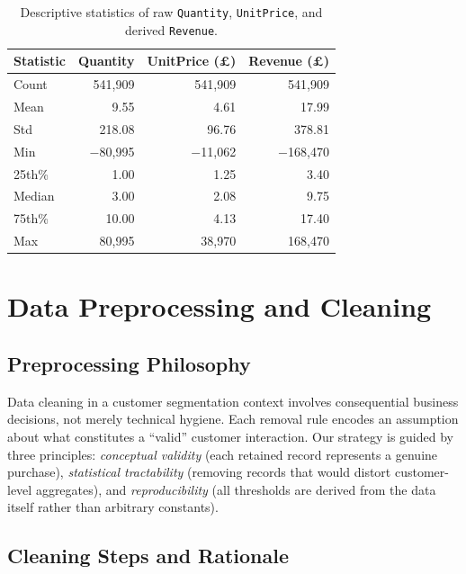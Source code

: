\documentclass[10pt,a4paper]{article}
\begin{document}
\begin{table}[H]
  \centering
  \caption{Descriptive statistics of raw \texttt{Quantity}, \texttt{UnitPrice}, and derived \texttt{Revenue}.}
  \label{tab:raw_stats}
  \begin{tabular}{lrrr}
    \toprule
    \textbf{Statistic} & \textbf{Quantity} & \textbf{UnitPrice (\pounds)} & \textbf{Revenue (\pounds)} \\
    \midrule
    Count  & 541,909  & 541,909  & 541,909  \\
    Mean   & 9.55     & 4.61     & 17.99    \\
    Std    & 218.08   & 96.76    & 378.81   \\
    Min    & $-$80,995 & $-$11,062 & $-$168,470 \\
    25th\% & 1.00     & 1.25     & 3.40     \\
    Median & 3.00     & 2.08     & 9.75     \\
    75th\% & 10.00    & 4.13     & 17.40    \\
    Max    & 80,995   & 38,970   & 168,470  \\
    \bottomrule
  \end{tabular}
\end{table}

\section{Data Preprocessing and Cleaning}

\subsection{Preprocessing Philosophy}

Data cleaning in a customer segmentation context involves consequential business
decisions, not merely technical hygiene.  Each removal rule encodes an assumption about
what constitutes a ``valid'' customer interaction.  Our strategy is guided by three
principles: \emph{conceptual validity} (each retained record represents a genuine
purchase), \emph{statistical tractability} (removing records that would distort
customer-level aggregates), and \emph{reproducibility} (all thresholds are derived
from the data itself rather than arbitrary constants).

\subsection{Cleaning Steps and Rationale}
\end{document}
